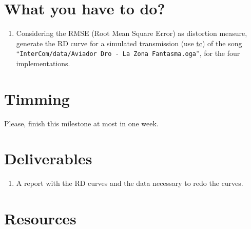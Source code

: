 \section{What you have to do?}

\begin{enumerate}
\item Considering the RMSE (Root Mean Square Error) as distortion
  measure, generate the RD curve for a simulated transmission (use
  \href{https://man7.org/linux/man-pages/man8/tc.8.html}{tc}) of the
  song ``\verb|InterCom/data/Aviador Dro - La Zona Fantasma.oga|'',
  for the four implementations.
\end{enumerate}

\section{Timming}

Please, finish this milestone at most in one week.

\section{Deliverables}

\begin{enumerate}
\item A report with the RD curves and the data necessary to redo the
  curves.
\end{enumerate}

\section{Resources}



